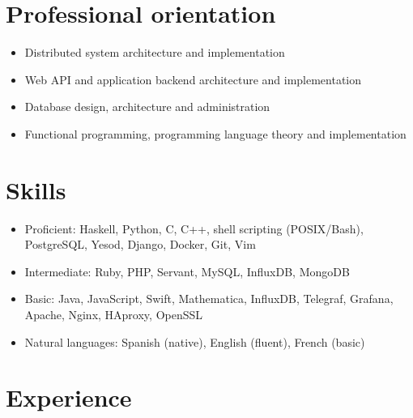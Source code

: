 \documentclass{res}
\begin{document}
\address{%
  \textbf{Computer engineering}, Universidad Sim\'on Bol\'{\i}var
  \\ Caracas, Venezuela
  \\ 1988--01--15
}
\address{%
  +58 412 0113514 / +58 414 3726393
  \\ \textsc{targen@gmail.com}
  \\ \textsc{http://keybase.io/mgomezch}
}

\begin{resume}

  \section{Professional orientation}
    \begin{itemize}
      \item Distributed system architecture and implementation
      \item Web API and application backend architecture and implementation
      \item Database design, architecture and administration
      \item Functional programming, programming language theory and implementation
    \end{itemize}

  \section{Skills}
    \begin{itemize}
      \item Proficient: Haskell, Python, C, C++, shell scripting (POSIX/Bash), PostgreSQL, Yesod, Django, Docker, Git, Vim
      \item Intermediate: Ruby, PHP, Servant, MySQL, InfluxDB, MongoDB
      \item Basic: Java, JavaScript, Swift, Mathematica, InfluxDB, Telegraf, Grafana, Apache, Nginx, HAproxy, OpenSSL
      \item Natural languages: Spanish (native), English (fluent), French (basic)
      \end{itemize}

\section{Experience}
  \begin{itemize}[leftmargin=-0.3in]
    \setlength\itemsep{1em}


\end{itemize}
\end{resume}
\end{document}
